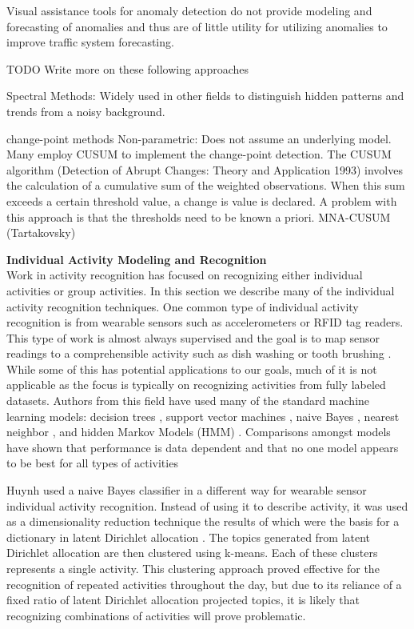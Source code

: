 Visual assistance tools for anomaly detection do not provide modeling and forecasting of anomalies and thus are of little utility for utilizing anomalies to improve traffic system forecasting.   

TODO Write more on these following approaches

Spectral Methods:
Widely used in other fields to distinguish hidden patterns and trends from a noisy background.
\cite{Barford2002}

change-point methods
Non-parametric: Does not assume an underlying model.  Many employ CUSUM to implement the change-point detection.  The CUSUM algorithm (Detection of Abrupt Changes: Theory and Application 1993) involves the calculation of a cumulative sum of the weighted observations.  When this sum exceeds a certain threshold value, a change is value is declared.  A problem with this approach is that the thresholds need to be known a priori.
MNA-CUSUM (Tartakovsky)


\bigskip
\noindent \textbf{Individual Activity Modeling and Recognition} \\
Work in activity recognition has focused on recognizing either individual activities or group activities.  In this section we describe many of the individual activity recognition techniques.  One common type of individual activity recognition is from wearable sensors such as accelerometers or RFID tag readers.  This type of work is almost always supervised and the goal is to map sensor readings to a comprehensible activity such as dish washing or tooth brushing \cite{Wang2009,Bao2004}.  While some of this has potential applications to our goals, much of it is not applicable as the focus is typically on recognizing activities from fully labeled datasets.  Authors from this field have used many of the standard machine learning models: decision trees \cite{Bao2004}, support vector machines \cite{Krishnan2008,Bao2004,Lustrek2009}, naive Bayes \cite{Bao2004,Lustrek2009}, nearest neighbor \cite{Bao2004,Lustrek2009}, and hidden Markov Models (HMM) \cite{Wang2009,Oliver2002}.  Comparisons amongst models have shown that performance is data dependent and that no one model appears to be best for all types of activities \cite{Bao2004,Lustrek2009}

Huynh \cite{Huynh2008} used a naive Bayes classifier in a different way for wearable sensor individual activity recognition.  Instead of using it to describe activity, it was used as a dimensionality reduction technique the results of which were the basis for a dictionary in latent Dirichlet allocation \cite{Blei2003}.  The topics generated from latent Dirichlet allocation are then clustered using k-means.  Each of these clusters represents a single activity.  This clustering approach proved effective for the recognition of repeated activities throughout the day, but due to its reliance of a fixed ratio of latent Dirichlet allocation projected topics, it is likely that recognizing combinations of activities will prove problematic.

